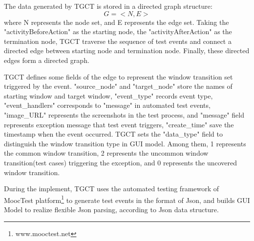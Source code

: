 The data generated by TGCT is stored in a directed graph structure: 
\begin{equation}
G = < N, E >
\end{equation}
where N represents the node set, and E represents the edge set. Taking the "activityBeforeAction" as the starting node, the "activityAfterAction" as the termination node, TGCT traverse the sequence of test events and connect a directed edge between starting node and termination node. Finally, these directed edges form a directed graph.

TGCT defines some fields of the edge to represent the window transition set triggered by the event. "source\_node" and "target\_node" store the names of starting window and target window, "event\_type" records event type, "event\_handlers" corresponds to "message" in automated test events, "image\_URL" represents the screenshots in the test process, and "message" field represents exception message that test event triggers, "create\_time" save the timestamp when the event occurred. TGCT sets the "data\_type" field to distinguish the window transition type in GUI model. Among them, 1 represents the common window transition, 2 represents the uncommon window transition(test cases) triggering the exception, and 0 represents the uncovered window transition.

During the implement, TGCT uses the automated testing framework of MoocTest platform\footnote{www.mooctest.net} to generate test events in the format of Json, and builds GUI Model to realize flexible Json parsing, according to Json data structure. 



